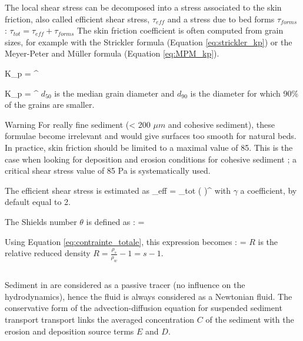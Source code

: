 
The local shear stress can be decomposed into a stress associated to the skin friction, also called efficient shear stress, $\tau_{eff}$ and a stress due to bed forms $\tau_{forms}$ : 
$\tau_{tot} = \tau_{eff} + \tau_{forms} $
The skin friction coefficient is often computed from grain sizes, for example with the Strickler formula (Equation \ref{eq:strickler_kp}) or the Meyer-Peter and Müller formula (Equation \ref{eq:MPM_kp}).

\bequ
	K_p = ^
	\label{eq:strickler_kp}
\eequ

\bequ
	K_p = ^
	\label{eq:MPM_kp}
\eequ
$d_{50}$ is the median grain diameter and $d_{90}$ is the diameter for which 90\% of the grains are smaller.

\begin{WarningBlock}{Warning}
	For really fine sediment (< 200 $\mu m$ and cohesive sediment), these formulae become irrelevant and would give surfaces too smooth for natural beds. 
	In practice, skin friction should be limited to a maximal value of 85.
	This is the case when looking for deposition and erosion conditions for cohesive sediment ; a critical shear stress value of 85 Pa is systematically used.
\end{WarningBlock}

The efficient shear stress is estimated as 
\bequ
	\tau_{eff} = \tau_{tot} \left(  \right)^\gamma
\eequ  
with $\gamma$ a coefficient, by default equal to 2.

The Shields number $\theta$ is defined as :
\bequ
	\theta = 
\eequ

Using Equation \ref{eq:contrainte_totale}, this expression becomes :
\bequ
	\theta = 
	\label{eq:shields}
\eequ
 $R$ is the relative reduced density $R=\frac{\rho_s}{\rho_w}-1 = s - 1$.

\subsection{\Csuspension}
Sediment in \Csuspension are considered as a passive tracer (no influence on the hydrodynamics), hence the fluid is always considered as a Newtonian fluid. 
The conservative form of the advection-diffusion equation for suspended sediment transport transport links the averaged concentration $C$ of the sediment with the erosion and deposition source terms $E$ and $D$.

